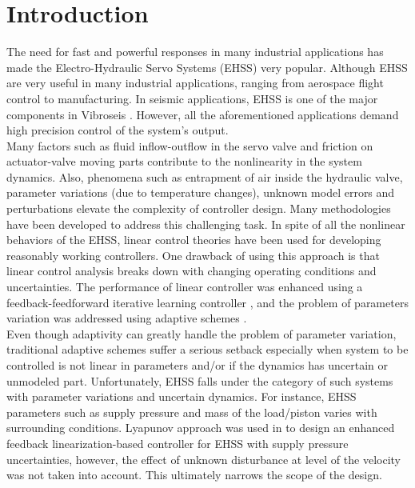 \documentclass{article} %
\begin{document}
\section{Introduction}
The need for fast and powerful responses in many industrial applications has made the Electro-Hydraulic Servo Systems (EHSS) very popular. Although EHSS are very useful in many industrial applications, ranging from aerospace flight control to manufacturing. In seismic applications, EHSS is one of the major components in Vibroseis \cite{mintsa_feedback_2012}. However, all the aforementioned applications demand high precision control of the system's output.
\\
\indent
Many factors such as fluid inflow-outflow in the servo valve and friction on actuator-valve moving parts contribute to the nonlinearity in the system dynamics. Also, phenomena such as entrapment of air inside the hydraulic valve, parameter variations (due to temperature changes), unknown model errors and perturbations elevate the complexity of controller design. Many methodologies have been developed to address this challenging task. In spite of all the nonlinear behaviors of the EHSS, linear control theories have been used for developing reasonably working controllers. One drawback of using this approach is that linear control analysis breaks down with changing operating conditions and uncertainties. The performance of linear controller was enhanced using a feedback-feedforward iterative learning controller \cite{wang_high_2012}, and the problem of parameters variation was addressed using adaptive schemes \cite{yanada_adaptive_2007,zhang_adaptive_2009}.\\
\indent
Even though adaptivity can greatly handle the problem of parameter variation, traditional adaptive schemes suffer a serious setback especially when system to be controlled is not linear in parameters and/or if the dynamics has uncertain or unmodeled part. Unfortunately, EHSS falls under the category of such systems with parameter variations and uncertain dynamics. For instance, EHSS parameters such as supply pressure and mass of the load/piston varies with surrounding conditions. Lyapunov approach was used in \cite{mintsa_feedback_2012} to design an enhanced feedback linearization-based controller for EHSS with supply pressure uncertainties, however, the effect of unknown disturbance at level of the velocity was not taken into account. This ultimately narrows the scope of the design.\\
\indent
\end{document}
